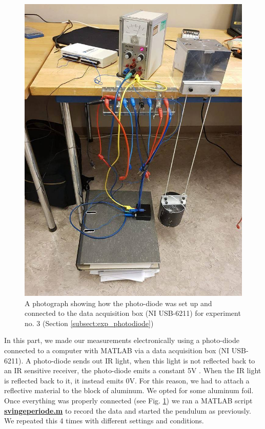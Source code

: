 \documentclass[%
 reprint,
 amsmath,amssymb,
 aps,
]{revtex4-1}
\begin{document}
        \begin{figure}
            \center
            \includegraphics[scale=0.3]{experiment3.jpg}
            \caption{A photograph showing how the photo-diode was set up and connected to the data acquisition box (NI USB-6211) for experiment no. 3 (Section \ref{subsect:exp_photodiode})}
            \label{fig:pendulum3}
        \end{figure}

        In this part, we made our measurements electronically using a photo-diode connected to a computer with MATLAB via a data acquisition box (NI USB-6211). A photo-diode sends out IR light, when this light is not reflected back to an IR sensitive receiver, the photo-diode emits a constant 5V . When the IR light is reflected back to it, it instead emits 0V. For this reason, we had to attach a reflective material to the block of aluminum. We opted for some aluminum foil.
        Once everything was properly connected (see Fig. \ref{fig:pendulum3}) we ran a MATLAB script \href{http://www.uio.no/studier/emner/matnat/fys/FYS2150/v18/kursmateriell/tid-og-frekvens/svingeperiode.m}{\textbf{svingeperiode.m}} to record the data and started the pendulum as previously. We repeated this 4 times with different settings and conditions.
\end{document}
